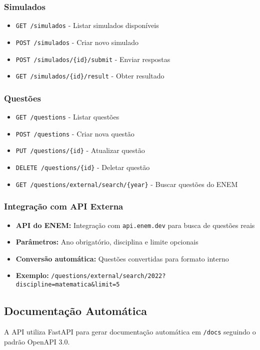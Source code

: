 \documentclass[12pt,a4paper]{article}
\begin{document}
\subsubsection{Simulados}
\begin{itemize}
    \item \texttt{GET /simulados} - Listar simulados disponíveis
    \item \texttt{POST /simulados} - Criar novo simulado
    \item \texttt{POST /simulados/\{id\}/submit} - Enviar respostas
    \item \texttt{GET /simulados/\{id\}/result} - Obter resultado
\end{itemize}

\subsubsection{Questões}
\begin{itemize}
    \item \texttt{GET /questions} - Listar questões
    \item \texttt{POST /questions} - Criar nova questão
    \item \texttt{PUT /questions/\{id\}} - Atualizar questão
    \item \texttt{DELETE /questions/\{id\}} - Deletar questão
    \item \texttt{GET /questions/external/search/\{year\}} - Buscar questões do ENEM
\end{itemize}

\subsubsection{Integração com API Externa}
\begin{itemize}
    \item \textbf{API do ENEM:} Integração com \texttt{api.enem.dev} para busca de questões reais
    \item \textbf{Parâmetros:} Ano obrigatório, disciplina e limite opcionais
    \item \textbf{Conversão automática:} Questões convertidas para formato interno
    \item \textbf{Exemplo:} \texttt{/questions/external/search/2022?discipline=matematica\&limit=5}
\end{itemize}

\subsection{Documentação Automática}
A API utiliza FastAPI para gerar documentação automática em \texttt{/docs} seguindo o padrão OpenAPI 3.0.
\end{document}
